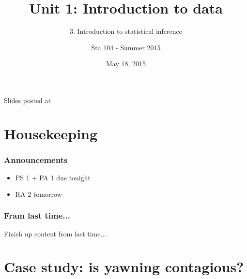 \documentclass[slidestop,compress,mathserif,12pt,t,professionalfonts,xcolor=table]{beamer}
\title{Unit 1: Introduction to data}
\subtitle{3. Introduction to statistical inference}
\author{Sta 104 - Summer 2015}
\date{May 18, 2015}
\institute{Duke University, Department of Statistical Science}
\begin{document}



\begin{frame}[plain]

\titlepage
\vfill
{\scriptsize {} \hfill Slides posted at  \webLink{\CourseSite}{\CourseSite}}
\addtocounter{framenumber}{-1} 

\end{frame}


\section{Housekeeping}


\begin{frame}
\frametitle{Announcements}

\begin{itemize}

\item PS 1 + PA 1 due tonight

\item RA 2 tomorrow

\end{itemize}

\end{frame}


\begin{frame}
\frametitle{Fram last time...}

\vfill

Finish up content from last time...

\vfill

\end{frame}


\section{Case study: is yawning contagious?}

\end{document}
